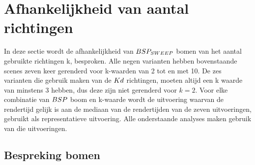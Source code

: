 \section{Afhankelijkheid van aantal richtingen}
In deze sectie wordt de afhankelijkheid van $BSP_{SWEEP}$ bomen van het aantal gebruikte richtingen k, besproken. 
Alle negen varianten hebben bovenstaande scenes zeven keer gerenderd voor k-waarden van 2 tot en met 10.
De zes varianten die gebruik maken van de $Kd$ richtingen, moeten altijd een k waarde van minstens 3 hebben, dus deze zijn niet gerenderd voor $k = 2$.
Voor elke combinatie van $BSP$ boom en k-waarde wordt de uitvoering waarvan de rendertijd gelijk is aan de mediaan van de rendertijden van de zeven uitvoeringen, gebruikt als representatieve uitvoering.
Alle onderstaande analyses maken gebruik van die uitvoeringen.
\subsection{Bespreking bomen}
\label{h5-richtingen-bespreking}
